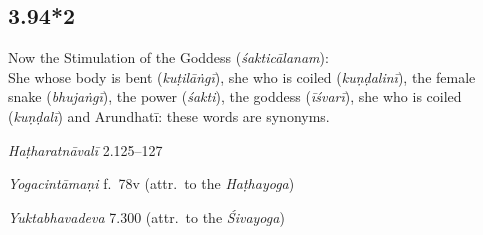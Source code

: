 \begin{ekdosis}
\subsection*{3.94*2}
\begin{translation}[hp03_094_2]
Now the Stimulation of the Goddess (\emph{śakticālanam}):\\ 
She whose body is bent (\emph{kuṭilāṅgī}), she who is coiled (\emph{kuṇḍalinī}), the female snake (\emph{bhujaṅgī}), the power (\emph{śakti}), the goddess (\emph{īśvarī}), she who is coiled (\emph{kuṇḍalī}) and Arundhatī: these words are synonyms.
\end{translation}


\begin{testimonia}[hp03_094_2]

\emph{Haṭharatnāvalī} 2.125–127
\begin{versinnote}
\end{versinnote}

\emph{Yogacintāmaṇi} f.~78v (attr.~to the \emph{Haṭhayoga})
\begin{versinnote}
\end{versinnote}

\emph{Yuktabhavadeva} 7.300 (attr.~to the \emph{Śivayoga})
\begin{versinnote}
\end{versinnote}


\end{testimonia}
\end{ekdosis}
